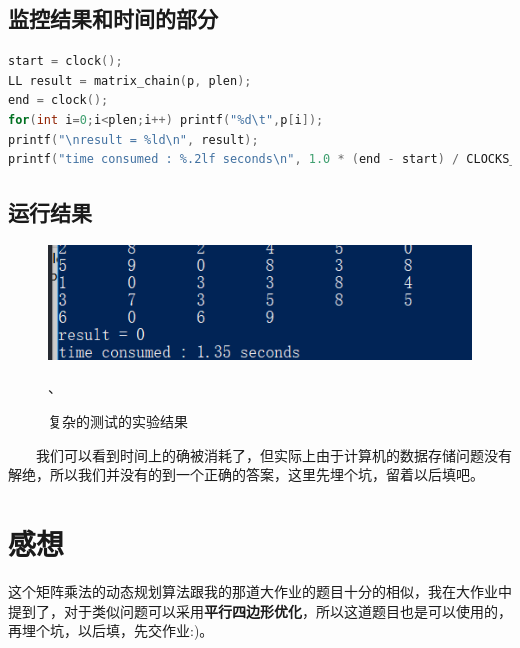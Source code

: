 \documentclass[11pt]{ctexart}
\begin{document}
\subsection{监控结果和时间的部分}
\begin{lstlisting}[language=C++]
start = clock();
LL result = matrix_chain(p, plen);
end = clock();
for(int i=0;i<plen;i++) printf("%d\t",p[i]);
printf("\nresult = %ld\n", result);
printf("time consumed : %.2lf seconds\n", 1.0 * (end - start) / CLOCKS_PER_SEC);
\end{lstlisting}

\subsection{运行结果}
\begin{figure}[H]
\centering
\includegraphics{4.png}
\caption{复杂的测试的实验结果}、
\end{figure}
\noindent　　我们可以看到时间上的确被消耗了，但实际上由于计算机的数据存储问题没有解绝，所以我们并没有的到一个正确的答案，这里先埋个坑，留着以后填吧。


\section{感想}
这个矩阵乘法的动态规划算法跟我的那道大作业的题目十分的相似，我在大作业中提到了，对于类似问题可以采用\textbf{平行四边形优化}，所以这道题目也是可以使用的，再埋个坑，以后填，先交作业:)。
\end{document}
